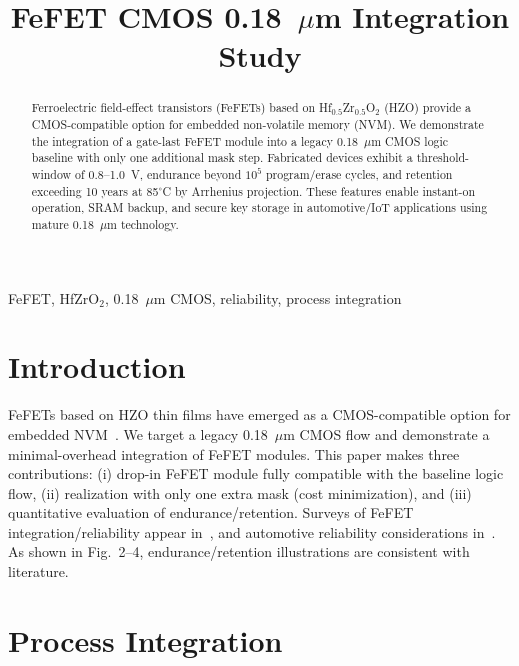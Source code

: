 \documentclass[conference]{IEEEtran}
\begin{document}
\title{FeFET CMOS 0.18~$\mu$m Integration Study}

\author{
}

\maketitle

\begin{abstract}
Ferroelectric field-effect transistors (FeFETs) based on Hf$_{0.5}$Zr$_{0.5}$O$_2$ (HZO) provide a CMOS-compatible option for embedded non-volatile memory (NVM). We demonstrate the integration of a gate-last FeFET module into a legacy 0.18~$\mu$m CMOS logic baseline with only one additional mask step. Fabricated devices exhibit a threshold-window of 0.8--1.0~V, endurance beyond $10^5$ program/erase cycles, and retention exceeding 10 years at 85$^\circ$C by Arrhenius projection. These features enable instant-on operation, SRAM backup, and secure key storage in automotive/IoT applications using mature 0.18~$\mu$m technology.
\end{abstract}

\begin{IEEEkeywords}
FeFET, HfZrO$_2$, 0.18~$\mu$m CMOS, reliability, process integration
\end{IEEEkeywords}

\section{Introduction}
FeFETs based on HZO thin films have emerged as a CMOS-compatible option for embedded NVM~\cite{Boscke2011,Mueller2012,Schenk2019}. We target a legacy 0.18~$\mu$m CMOS flow and demonstrate a minimal-overhead integration of FeFET modules. This paper makes three contributions: (i) drop-in FeFET module fully compatible with the baseline logic flow, (ii) realization with only one extra mask (cost minimization), and (iii) quantitative evaluation of endurance/retention. Surveys of FeFET integration/reliability appear in~\cite{Mueller2015,Park2020}, and automotive reliability considerations in~\cite{Nakamura2003}. As shown in Fig.~2--4, endurance/retention illustrations are consistent with literature.

\section{Process Integration}
\end{document}
